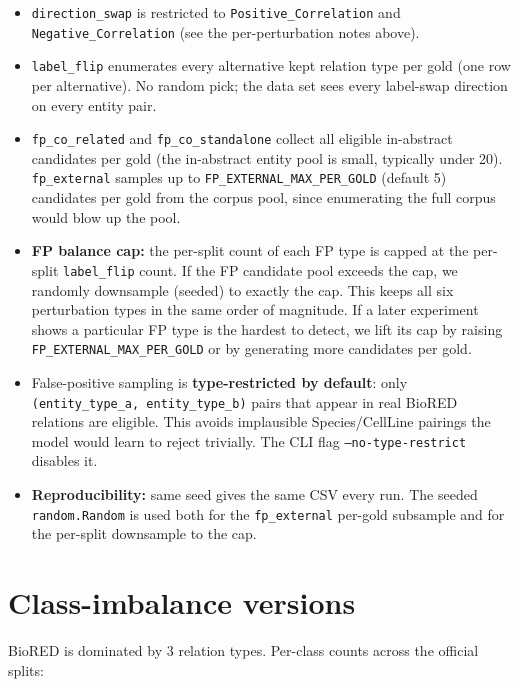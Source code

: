 \documentclass[11pt,a4paper]{article}
\newcommand{\code}[1]{\texttt{#1}}
\begin{document}
\begin{itemize}
\item \code{direction\_swap} is restricted to \code{Positive\_Correlation} and \code{Negative\_Correlation} (see the per-perturbation notes above).
\item \code{label\_flip} enumerates every alternative kept relation type per gold (one row per alternative). No random pick; the data set sees every label-swap direction on every entity pair.
\item \code{fp\_co\_related} and \code{fp\_co\_standalone} collect all eligible in-abstract candidates per gold (the in-abstract entity pool is small, typically under 20). \code{fp\_external} samples up to \code{FP\_EXTERNAL\_MAX\_PER\_GOLD} (default 5) candidates per gold from the corpus pool, since enumerating the full corpus would blow up the pool.
\item \textbf{FP balance cap:} the per-split count of each FP type is capped at the per-split \code{label\_flip} count. If the FP candidate pool exceeds the cap, we randomly downsample (seeded) to exactly the cap. This keeps all six perturbation types in the same order of magnitude. If a later experiment shows a particular FP type is the hardest to detect, we lift its cap by raising \code{FP\_EXTERNAL\_MAX\_PER\_GOLD} or by generating more candidates per gold.
\item False-positive sampling is \textbf{type-restricted by default}: only \code{(entity\_type\_a, entity\_type\_b)} pairs that appear in real BioRED relations are eligible. This avoids implausible Species/CellLine pairings the model would learn to reject trivially. The CLI flag \code{--no-type-restrict} disables it.
\item \textbf{Reproducibility:} same seed gives the same CSV every run. The seeded \code{random.Random} is used both for the \code{fp\_external} per-gold subsample and for the per-split downsample to the cap.
\end{itemize}

\section*{Class-imbalance versions}

BioRED is dominated by 3 relation types. Per-class counts across the official splits:
\end{document}
